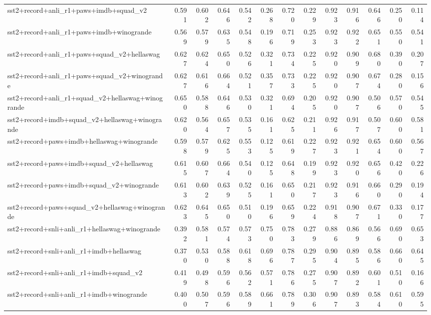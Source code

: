 \begin{table}[t]
\begin{tabular}{lrrrrrrrrrrrr}
    sst2+record+anli\_r1+paws+imdb+squad\_v2 & 0.591 & 0.602 & 0.646 & 0.542 & 0.268 & 0.720 & 0.229 & 0.923 & 0.916 & 0.646 & 0.250 & 0.114 \\
    sst2+record+anli\_r1+paws+imdb+winogrande & 0.569 & 0.579 & 0.635 & 0.548 & 0.196 & 0.719 & 0.253 & 0.923 & 0.922 & 0.651 & 0.550 & 0.541 \\
    sst2+record+anli\_r1+paws+squad\_v2+hellaswag & 0.627 & 0.624 & 0.650 & 0.526 & 0.321 & 0.734 & 0.225 & 0.920 & 0.909 & 0.680 & 0.390 & 0.207 \\
    sst2+record+anli\_r1+paws+squad\_v2+winogrande & 0.627 & 0.616 & 0.664 & 0.521 & 0.357 & 0.733 & 0.225 & 0.920 & 0.907 & 0.674 & 0.280 & 0.156 \\
    sst2+record+anli\_r1+squad\_v2+hellaswag+winogrande & 0.650 & 0.588 & 0.646 & 0.530 & 0.321 & 0.694 & 0.205 & 0.920 & 0.907 & 0.506 & 0.570 & 0.545 \\
    sst2+record+imdb+squad\_v2+hellaswag+winogrande & 0.620 & 0.564 & 0.657 & 0.535 & 0.161 & 0.625 & 0.211 & 0.926 & 0.917 & 0.507 & 0.600 & 0.581 \\
    sst2+record+paws+imdb+hellaswag+winogrande & 0.598 & 0.579 & 0.625 & 0.553 & 0.125 & 0.619 & 0.227 & 0.923 & 0.921 & 0.654 & 0.600 & 0.567 \\
    sst2+record+paws+imdb+squad\_v2+hellaswag & 0.615 & 0.607 & 0.664 & 0.540 & 0.125 & 0.648 & 0.199 & 0.923 & 0.920 & 0.656 & 0.420 & 0.226 \\
    sst2+record+paws+imdb+squad\_v2+winogrande & 0.613 & 0.602 & 0.639 & 0.525 & 0.161 & 0.650 & 0.217 & 0.923 & 0.916 & 0.660 & 0.290 & 0.194 \\
    sst2+record+paws+squad\_v2+hellaswag+winogrande & 0.623 & 0.645 & 0.650 & 0.510 & 0.196 & 0.659 & 0.224 & 0.918 & 0.907 & 0.671 & 0.330 & 0.177 \\
    sst2+record+snli+anli\_r1+hellaswag+winogrande & 0.392 & 0.581 & 0.574 & 0.573 & 0.750 & 0.783 & 0.279 & 0.886 & 0.869 & 0.566 & 0.690 & 0.653 \\
    sst2+record+snli+anli\_r1+imdb+hellaswag & 0.370 & 0.530 & 0.588 & 0.618 & 0.696 & 0.787 & 0.295 & 0.904 & 0.895 & 0.586 & 0.660 & 0.645 \\
    sst2+record+snli+anli\_r1+imdb+squad\_v2 & 0.419 & 0.498 & 0.596 & 0.562 & 0.571 & 0.786 & 0.275 & 0.907 & 0.892 & 0.601 & 0.510 & 0.166 \\
    sst2+record+snli+anli\_r1+imdb+winogrande & 0.400 & 0.507 & 0.596 & 0.589 & 0.661 & 0.789 & 0.306 & 0.907 & 0.893 & 0.584 & 0.610 & 0.595 \\

\end{tabular}
\end{table}

